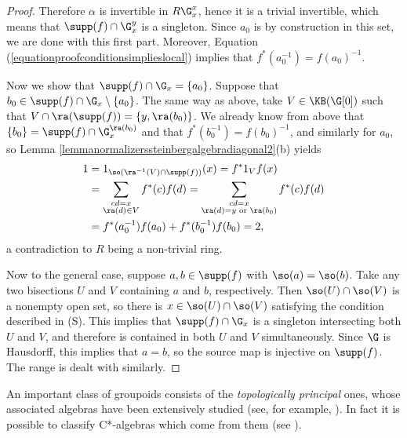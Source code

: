 \begin{proof}
Therefore $\alpha$ is invertible in $R\G_x^x$, hence it is a trivial invertible, which means that $\supp(f)\cap \G_x^y$ is a singleton. Since $a_0$ is by construction in this set, we are done with this first part. Moreover, Equation (\ref{equationproofconditionsimplieslocal}) implies that $f^*(a_0^{-1})=f(a_0)^{-1}$.


Now we show that $\supp(f)\cap\G_x=\left\{a_0\right\}$. Suppose that $b_0\in\supp(f)\cap \G_x\setminus\left\{a_0\right\}$. The same way as above, take $V\in\KB(\G[0])$ such that $V\cap \ra(\supp(f))=\left\{y,\ra(b_0)\right\}$. We already know from above that $\left\{b_0\right\}=\supp(f)\cap\G_x^{\ra(b_0)}$ and that $f^*(b_0^{-1})=f(b_0)^{-1}$, and similarly for $a_0$, so Lemma \ref{lemmanormalizerssteinbergalgebradiagonal2}(b) yields
\begin{align*}
1&=1_{\so(\ra^{-1}(V)\cap\supp(f))}(x)=f^*1_Vf(x)\\
&=\sum_{\substack{cd=x\\\ra(d)\in V}}f^*(c)f(d)=\sum_{\substack{cd=x\\\ra(d)=y\text{ or }\ra(b_0)}}f^*(c)f(d)\\
&=f^*(a_0^{-1})f(a_0)+f^*(b_0^{-1})f(b_0)=2,
\end{align*}
a contradiction to $R$ being a non-trivial ring.

Now to the general case, suppose $a,b\in\supp(f)$ with $\so(a)=\so(b)$. Take any two bisections $U$ and $V$ containing $a$ and $b$, respectively. Then $\so(U)\cap \so(V)$ is a nonempty open set, so there is $x\in \so(U)\cap \so(V)$ satisfying the condition described in (S). This implies that $\supp(f)\cap\G_x$ is a singleton intersecting both $U$ and $V$, and therefore is contained in both $U$ and $V$ simultaneously. Since $\G$ is Hausdorff, this implies that $a=b$, so the source map is injective on $\supp(f)$. The range is dealt with similarly.\qedhere
\end{proof}

An important class of groupoids consists of the \emph{topologically principal} ones, whose associated algebras have been extensively studied (see, for example, \cite{MR3189105,MR2745642,MR1681679,MR2590626}). In fact it is possible to classify C*-algebras which come from them (see \cite{MR2460017}).

